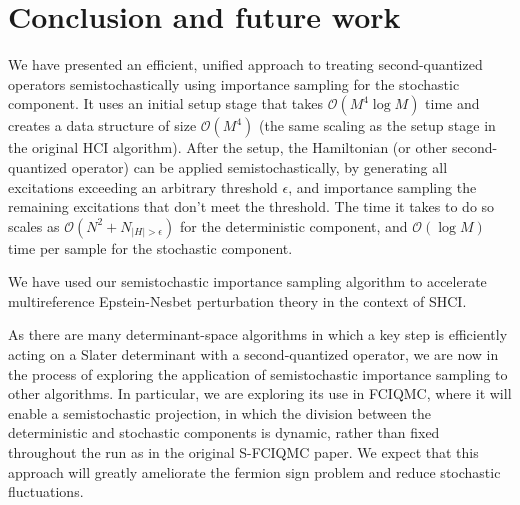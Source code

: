 \documentclass[english]{article}
\begin{document}
\section{Conclusion and future work}
We have presented an efficient, unified approach to treating second-quantized operators semistochastically using importance sampling for the stochastic component. It uses an initial setup stage that takes $\mathcal{O}(M^4\log M)$ time and creates a data structure of size $\mathcal{O}(M^4)$ (the same scaling as the setup stage in the original HCI algorithm). After the setup, the Hamiltonian (or other second-quantized operator) can be applied semistochastically, by generating all excitations exceeding an arbitrary threshold $\epsilon$, and importance sampling the remaining excitations that don't meet the threshold. The time it takes to do so scales as $\mathcal{O}(N^2 + N_{|H|>\epsilon})$ for the deterministic component, and $\mathcal{O}(\log M)$ time per sample for the stochastic component.

We have used our semistochastic importance sampling algorithm to accelerate multireference Epstein-Nesbet perturbation theory in the context of SHCI.

As there are many determinant-space algorithms in which a key step is efficiently acting on a Slater determinant with a second-quantized operator, we are now in the process of exploring the application of semistochastic importance sampling to other algorithms. In particular, we are exploring its use in FCIQMC, where it will enable a semistochastic projection, in which the division between the deterministic and stochastic components is dynamic, rather than fixed throughout the run as in the original S-FCIQMC paper. We expect that this approach will greatly ameliorate the fermion sign problem and reduce stochastic fluctuations.
\end{document}
